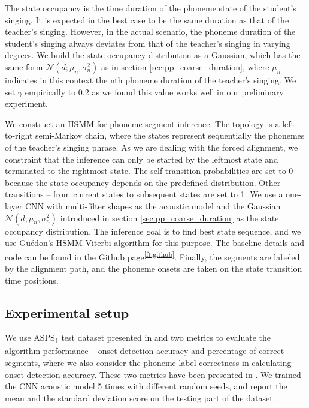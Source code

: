 The state occupancy is the time duration of the phoneme state of the student's singing. It is expected in the best case to be the same duration as that of the teacher's singing. However, in the actual scenario, the phoneme duration of the student's singing always deviates from that of the teacher's singing in varying degrees. We build the state occupancy distribution as a Gaussian, which has the same form $\mathcal{N} (d; {\mu_n}, \sigma_n^2)$ as in section \ref{sec:pp_coarse_duration}, where $\mu_n$ indicates in this context the nth phoneme duration of the teacher's singing. We set $\gamma$ empirically to 0.2 as we found this value works well in our preliminary experiment.

We construct an \gls{HSMM} for phoneme segment inference. The topology is a left-to-right semi-Markov chain, where the states represent sequentially the phonemes of the teacher's singing phrase. As we are dealing with the forced alignment, we constraint that the inference can only be started by the leftmost state and terminated to the rightmost state. The self-transition probabilities are set to 0 because the state occupancy depends on the predefined distribution. Other transitions -- from current states to subsequent states are set to 1. We use a one-layer \gls{CNN} with multi-filter shapes as the acoustic model \cite{Pons2017Timbre} and the Gaussian $\mathcal{N} (d; {\mu_n}, \sigma_n^2)$ introduced in section \ref{sec:pp_coarse_duration} as the state occupancy distribution. The inference goal is to find best state sequence, and we use Gu\'{e}don's \gls{HSMM} Viterbi algorithm \cite{GUEDON20072379} for this purpose. The baseline details and code can be found in the Github page\textsuperscript{\ref{ft:github}}. Finally, the segments are labeled by the alignment path, and the phoneme onsets are taken on the state transition time positions.

\subsection{Experimental setup}

We use \gls{ASPS}\textsubscript{1} test dataset presented in  and two metrics to evaluate the algorithm performance -- onset detection accuracy and percentage of correct segments, where we also consider the phoneme label correctness in calculating onset detection accuracy. These two metrics have been presented in . We trained the \gls{CNN} acoustic model 5 times with different random seeds, and report the mean and the standard deviation score on the testing part of the dataset.

